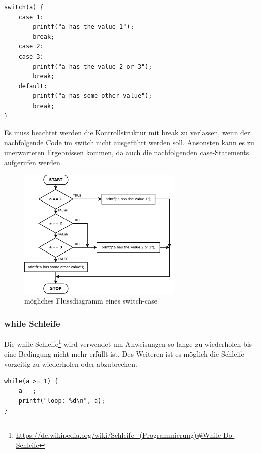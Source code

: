 
\begin{lstlisting}[language=CMM]
switch(a) {
	case 1:
		printf("a has the value 1");
		break;
	case 2:
	case 3:
		printf("a has the value 2 or 3");
		break;
	default:
		printf("a has some other value");
		break;
}
\end{lstlisting}

Es muss beachtet werden die Kontrollstruktur mit break zu verlassen, wenn der nachfolgende Code im switch nicht ausgef\"uhrt werden soll. Ansonsten kann es zu unerwarteten Ergebnissen kommen, da auch die nachfolgenden case-Statements aufgerufen werden.

\begin{figure}[h]
\centering
\includegraphics[width=0.7\textwidth]{./media/images/compiler/language_specification_switch_case.png}
\caption{m\"ogliches Flussdiagramm eines switch-case}
\label{language_specification_switch_case}
\end{figure}

\newpage
\subsubsection{while Schleife}

Die while Schleife\footnote{\url{https://de.wikipedia.org/wiki/Schleife_(Programmierung)\#While-Do-Schleife}} wird verwendet um Anweisungen so lange zu wiederholen bis eine Bedingung nicht mehr erf\"ullt ist. Des Weiteren ist es m\"oglich die Schleife vorzeitig zu wiederholen oder abzubrechen. 


\begin{lstlisting}[language=CMM]
while(a >= 1) {
	a --;
	printf("loop: %d\n", a);
}
\end{lstlisting}

